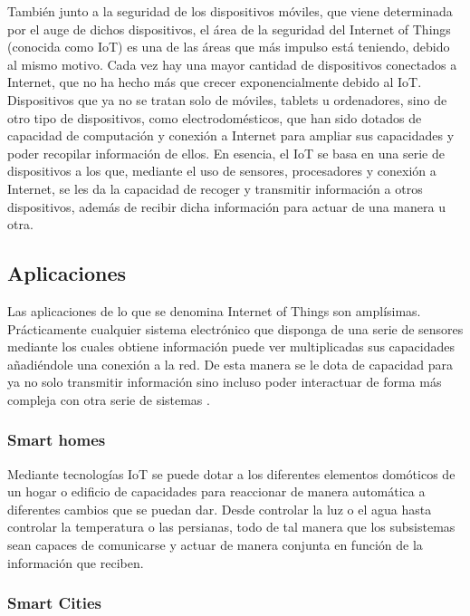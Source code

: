 También junto a la seguridad de los dispositivos móviles, que viene determinada por el auge de dichos dispositivos, el área de la seguridad del Internet of Things (conocida como IoT) es una de las áreas que más impulso está teniendo, debido al mismo motivo. Cada vez hay una mayor cantidad de dispositivos conectados a Internet, que no ha hecho más que crecer exponencialmente debido al IoT. Dispositivos que ya no se tratan solo de móviles, tablets u ordenadores, sino de otro tipo de dispositivos, como electrodomésticos, que han sido dotados de capacidad de computación y conexión a Internet para ampliar sus capacidades y poder recopilar información de ellos. En esencia, el IoT se basa en una serie de dispositivos a los que, mediante el uso de sensores, procesadores y conexión a Internet, se les da la capacidad de recoger y transmitir información a otros dispositivos, además de recibir dicha información para actuar de una manera u otra.

\subsection{Aplicaciones}

Las aplicaciones de lo que se denomina Internet of Things son amplísimas. Prácticamente cualquier sistema electrónico que disponga de una serie de sensores mediante los cuales obtiene información puede ver multiplicadas sus capacidades añadiéndole una conexión a la red. De esta manera se le dota de capacidad para ya no solo transmitir información sino incluso poder interactuar de forma más compleja con otra serie de sistemas \cite{Miorandi20121497} \cite{Gubbi20131645}.
	
\subsubsection{Smart homes}

Mediante tecnologías IoT se puede dotar a los diferentes elementos domóticos de un hogar o edificio de capacidades para reaccionar de manera automática a diferentes cambios que se puedan dar. Desde controlar la luz o el agua hasta controlar la temperatura o las persianas, todo de tal manera que los subsistemas sean capaces de comunicarse y actuar de manera conjunta en función de la información que reciben.
	
\subsubsection{Smart Cities}

